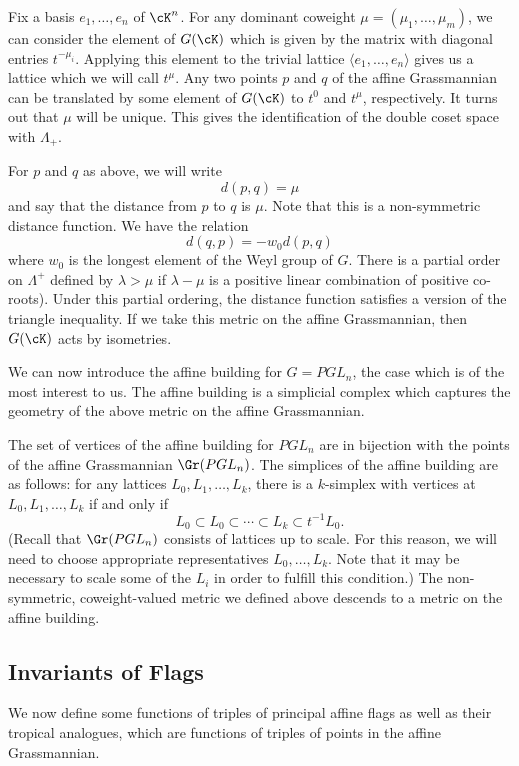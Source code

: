 Fix a basis $e_1, \dots, e_n$ of $\cK^n$. For any dominant coweight $\mu=(\mu_1, \dots, \mu_m)$, we can consider the element of $G(\cK)$ which is given by the matrix with diagonal entries $t^{-\mu_i}$. Applying this element to the trivial lattice $\langle e_1, \dots, e_n\rangle $ gives us a lattice which we will call $t^\mu$. Any two points $p$ and $q$ of the affine Grassmannian can be translated by some element of $G(\cK)$ to $t^0$ and $t^\mu$, respectively. It turns out that $\mu$ will be unique. This gives the identification of the double coset space with $\Lambda_+$.

For $p$ and $q$ as above, we will write 
\[
d(p,q) = \mu
\]
and say that the distance from $p$ to $q$ is $\mu$. Note that this is a non-symmetric distance function. We have the relation 
\[
d(q,p)=-w_0 d(p,q)
\]
 where $w_0$ is the longest element of the Weyl group of $G$. There is a partial order on $\Lambda^+$ defined by $\lambda > \mu$ if $\lambda - \mu$ is a positive linear combination of positive co-roots). Under this partial ordering, the distance function satisfies a version of the triangle inequality. If we take this metric on the affine Grassmannian, then $G(\cK)$ acts by isometries.

We can now introduce the affine building for $G=PGL_n$, the case which is of the most interest to us. The affine building is a simplicial complex which captures the geometry of the above metric on the affine Grassmannian.

The set of vertices of the affine building for $PGL_n$ are in bijection with the points of the affine Grassmannian $\Gr(PGL_n)$. The simplices of the affine building are as follows: for any lattices $L_0, L_1, \dots, L_k$, there is a $k$-simplex with vertices at $L_0, L_1, \dots, L_k$ if and only if 
\[
L_0 \subset L_0 \subset \cdots \subset L_k \subset t^{-1}L_0.
\]
(Recall that $\Gr(PGL_n)$ consists of lattices up to scale. For this reason, we will need to choose appropriate representatives $L_0, \dots, L_k$. Note that it may be necessary to scale some of the $L_i$ in order to fulfill this condition.) The non-symmetric, coweight-valued metric we defined above descends to a metric on the affine building.

\subsection{Invariants of Flags}

We now define some functions of triples of principal affine flags as well as their tropical analogues, which are functions of triples of points in the affine Grassmannian.

